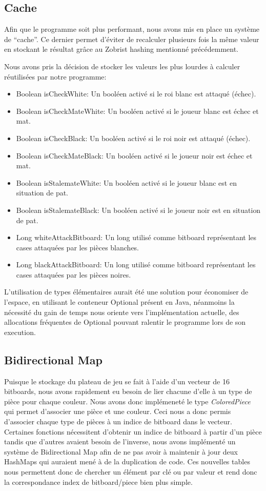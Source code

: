 \documentclass{article}
\begin{document}
\subsection{Cache}
Afin que le programme soit plus performant, nous avons mis en place un système de ``cache''. Ce dernier permet d'éviter de recalculer plusieurs fois la même valeur en stockant le résultat grâce au Zobrist hashing mentionné précédemment.

Nous avons pris la décision de stocker les valeurs les plus lourdes à calculer réutilisées par notre programme:
\begin{itemize}
    \item Boolean isCheckWhite: Un booléen activé si le roi blanc est attaqué (échec).
    \item Boolean isCheckMateWhite: Un booléen activé si le joueur blanc est échec et mat.
    \item Boolean isCheckBlack: Un booléen activé si le roi noir est attaqué (échec).
    \item Boolean isCheckMateBlack: Un booléen activé si le joueur noir est échec et mat.
    \item Boolean isStalemateWhite: Un booléen activé si le joueur blanc est en situation de pat.
    \item Boolean isStalemateBlack: Un booléen activé si le joueur noir est en situation de pat.
    \item Long whiteAttackBitboard: Un long utilisé comme bitboard représentant les cases attaquées par les pièces blanches.
    \item Long blackAttackBitboard: Un long utilisé comme bitboard représentant les cases attaquées par les pièces noires.
\end{itemize}

L'utilisation de types élémentaires aurait été une solution pour économiser de l'espace, en utilisant le conteneur Optional présent en Java, néanmoins la nécessité du gain de temps nous oriente vers l'implémentation actuelle, des allocations fréquentes de Optional pouvant ralentir le programme lors de son execution.

\subsection{Bidirectional Map}
Puisque le stockage du plateau de jeu se fait à l'aide d'un vecteur de 16 bitboards, nous avons rapidement eu besoin de lier chacune d'elle à un type de pièce pour chaque couleur.
Nous avons donc implémeneté le type \textit{ColoredPiece} qui permet d'associer une pièce et une couleur. Ceci nous a donc permis d'associer chaque type de pièces à un indice
de bitboard dans le vecteur. Certaines fonctions nécessitent d'obtenir un indice de bitboard à partir d'un pièce tandis que d'autres avaient besoin de l'inverse, nous avons implémenté un système
de Bidirectional Map afin de ne pas avoir à maintenir à jour deux HashMaps qui auraient mené à de la duplication de code. Ces nouvelles tables nous permettent donc de chercher un élément par clé ou par valeur et rend donc la
correspondance index de bitboard/piece bien plus simple.
\end{document}
